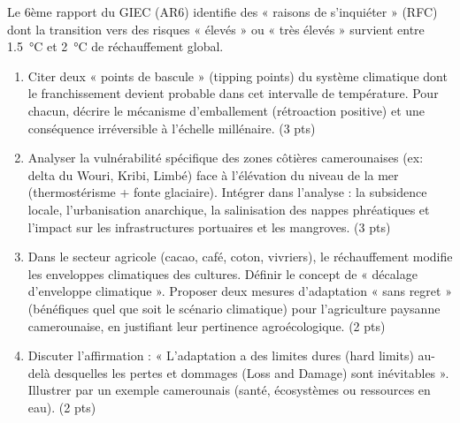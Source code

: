 \documentclass[11pt]{article}
\begin{document}
\begin{exercice}
Le 6ème rapport du GIEC (AR6) identifie des « raisons de s'inquiéter » (RFC) dont la transition vers des risques « élevés » ou « très élevés » survient entre \SI{1,5}{\celsius} et \SI{2}{\celsius} de réchauffement global.

\begin{enumerate}
    \item Citer deux « points de bascule » (tipping points) du système climatique dont le franchissement devient probable dans cet intervalle de température. Pour chacun, décrire le mécanisme d'emballement (rétroaction positive) et une conséquence irréversible à l'échelle millénaire. (3 pts)
    \item Analyser la vulnérabilité spécifique des zones côtières camerounaises (ex: delta du Wouri, Kribi, Limbé) face à l'élévation du niveau de la mer (thermostérisme + fonte glaciaire). Intégrer dans l'analyse : la subsidence locale, l'urbanisation anarchique, la salinisation des nappes phréatiques et l'impact sur les infrastructures portuaires et les mangroves. (3 pts)
    \item Dans le secteur agricole (cacao, café, coton, vivriers), le réchauffement modifie les enveloppes climatiques des cultures. Définir le concept de « décalage d'enveloppe climatique ». Proposer deux mesures d'adaptation « sans regret » (bénéfiques quel que soit le scénario climatique) pour l'agriculture paysanne camerounaise, en justifiant leur pertinence agroécologique. (2 pts)
    \item Discuter l'affirmation : « L'adaptation a des limites dures (hard limits) au-delà desquelles les pertes et dommages (Loss and Damage) sont inévitables ». Illustrer par un exemple camerounais (santé, écosystèmes ou ressources en eau). (2 pts)
\end{enumerate}
\end{exercice}
\end{document}
